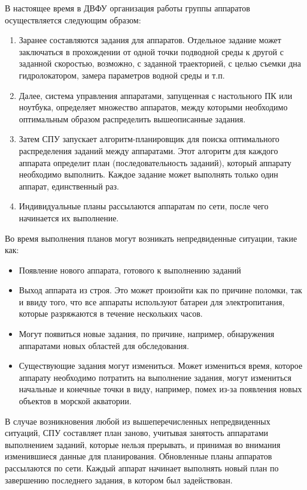 \documentclass[a4paper,14pt,russian]{article}
\begin{document}
В настоящее время в ДВФУ организация работы группы аппаратов осуществляется следующим образом:
\begin{enumerate}
\item Заранее составляются задания для аппаратов. Отдельное задание может заключаться в прохождении от одной точки подводной среды к другой с заданной скоростью, возможно, с заданной траекторией, с целью съемки дна гидролокатором, замера параметров водной среды и т.п.
\item Далее, система управления аппаратами, запущенная с настольного ПК или ноутбука, определяет множество аппаратов, между которыми необходимо оптимальным образом распределить вышеописанные задания.
\item Затем СПУ запускает алгоритм-планировщик для поиска оптимального распределения заданий между аппаратами. Этот алгоритм для каждого аппарата определит план (последовательность заданий), который аппарату необходимо выполнить. Каждое задание может выполнять только один аппарат, единственный раз.
\item Индивидуальные планы рассылаются аппаратам по сети, после чего начинается их выполнение.
\end{enumerate}

Во время выполнения планов могут возникать непредвиденные ситуации, такие как:
\begin{itemize}
\item Появление нового аппарата, готового к выполнению заданий
\item Выход аппарата из строя. Это может произойти как по причине поломки, так и ввиду того, что все аппараты используют батареи для электропитания, которые разряжаются в течение нескольких часов.
\item Могут появиться новые задания, по причине, например, обнаружения аппаратами новых областей для обследования.
\item Существующие задания могут измениться. Может измениться время, которое аппарату необходимо потратить на выполнение задания, могут измениться начальные и конечные точки в виду, например, помех из-за появления новых объектов в морской акватории.
\end{itemize}

В случае возникновения любой из вышеперечисленных непредвиденных ситуаций, СПУ составляет план заново, учитывая занятость аппаратами выполнением заданий, которые нельзя прерывать, и принимая во внимания изменившиеся данные для планирования. Обновленные планы аппаратов рассылаются по сети. Каждый аппарат начинает выполнять новый план по завершению последнего задания, в котором был задействован.
\end{document}

